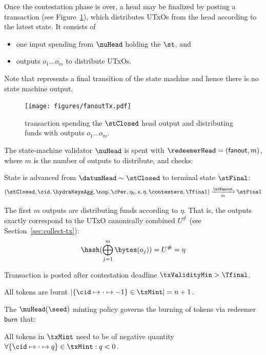 Once the contestation phase is over, a head may be finalized by posting a
\mtxFanout{} transaction (see Figure~\ref{fig:fanoutTx}), which
distributes UTxOs from the head according to the latest state. It consists of
\begin{itemize}
	\item one input spending from $\nuHead$ holding the $\st$, and
	\item outputs $o_{1} \dots o_{m}$ to distribute UTxOs.
\end{itemize}

Note that \mtxFanout{} represents a final transition of the state machine and
hence there is no state machine output.

\begin{figure}[h]
	\centering
	\texttt{[image: figures/fanoutTx.pdf]}
	\caption{\mtxFanout{} transaction spending the $\stClosed$ head output and
		distributing funds with outputs $o_{1} \dots o_{m}$.}\label{fig:fanoutTx}
\end{figure}

\noindent The state-machine validator $\nuHead$ is spent with
$\redeemerHead = (\mathsf{fanout}, m)$, where $m$ is the number of outputs to
distribute, and checks:
\begin{menumerate}
	\item State is advanced from $\datumHead \sim \stClosed$ to terminal state
	$\stFinal$: %
	\[
		(\stClosed,\cid,\hydraKeysAgg,\nop,\cPer,\eta_0,s,\eta,\contesters,\Tfinal) \xrightarrow[m]{\stFanout} \stFinal
	\]
	\item The first $m$ outputs are distributing funds according to
	$\eta$. That is, the outputs exactly correspond to the UTxO
	canonically combined $U^{\#}$ (see Section~\ref{sec:collect-tx}):
	\[
		\hash(\bigoplus_{j=1}^{m} \bytes(o_{j})) = U^{\#} = \eta
	\]
	\item Transaction is posted after contestation deadline $\txValidityMin > \Tfinal$.
	\item All tokens are burnt
	$|\{\cid \mapsto \cdot \mapsto -1\} \in \txMint| = n + 1$.
\end{menumerate}

\noindent The $\muHead(\seed)$ minting policy governs the burning of tokens via
redeemer $\mathsf{burn}$ that:
\begin{menumerate}
	\item All tokens in $\txMint$ need to be of negative quantity
	$\forall \{\cid \mapsto \cdot \mapsto q\} \in \txMint : q < 0$.
\end{menumerate}

\FloatBarrier{}

